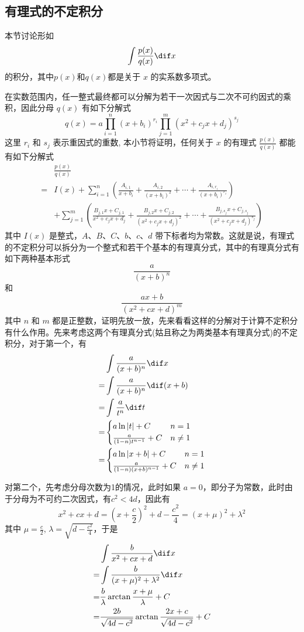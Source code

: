 \subsection{有理式的不定积分}
\label{sec:indefinite-integration-of-rational-function}

本节讨论形如
\[ \int \frac{p(x)}{q(x)} \dif x \]
的积分，其中$p(x)$和$q(x)$都是关于 $x$ 的实系数多项式。

在实数范围内，任一整式最终都可以分解为若干一次因式与二次不可约因式的乘积，因此分母 $q(x)$ 有如下分解式
\[ q(x) = a \prod_{i=1}^n(x+b_i)^{r_i} \prod_{j=1}^m(x^2+c_j x + d_j)^{s_j} \]
这里 $r_i$ 和 $s_j$ 表示重因式的重数, 本小节将证明，任何关于 $x$ 的有理式 $ \frac{p(x)}{q(x)} $ 都能有如下分解式
\begin{align*}
 & \frac{p(x)}{q(x)} \\
 = & I(x) + \sum_{i=1}^{n} \left( \frac{A_{i,1}}{x+b_i} + \frac{A_{i,2}}{(x+b_i)^2} + \cdots + \frac{A_{i,r_i}}{(x+b_i)^{r_i}}  \right) \\
 & + \sum_{j=1}^m \left( \frac{B_{j,1}x+C_{j,1}}{x^2+c_j x + d_j} + \frac{B_{j,2}x+C_{j,2}}{(x^2+c_j x + d_j)^2} + \cdots + \frac{B_{j,s_j}x+C_{j,s_j}}{(x^2+c_j x + d_j)^{s_j}} \right)
\end{align*}
其中 $I(x)$ 是整式，$A$、$B$、$C$、$b$、$c$、$d$ 带下标者均为常数。这就是说，有理式的不定积分可以拆分为一个整式和若干个基本的有理真分式，其中的有理真分式有如下两种基本形式
\[ \frac{a}{(x+b)^n} \]
和
\[ \frac{ax+b}{(x^2+cx+d)^m}  \]
其中 $n$ 和 $m$ 都是正整数，证明先放一放，先来看看这样的分解对于计算不定积分有什么作用。先来考虑这两个有理真分式(姑且称之为两类基本有理真分式)的不定积分，对于第一个，有
\begin{align*}
 & \int \frac{a}{(x+b)^n} \dif x \\
 = & \int \frac{a}{(x+b)^n}  \dif (x+b) \\
 = &\int \frac{a}{t^n} \dif t \\
 = & 
 \begin{cases}
    a\ln|t| + C & n=1 \\
    \frac{a}{(1-n)t^{n-1}} + C & n \neq 1
 \end{cases} \\
 = &
  \begin{cases}
    a\ln{|x+b|} + C & n=1 \\
    \frac{a}{(1-n)(x+b)^{n-1}} + C & n \neq 1
 \end{cases} \\
\end{align*}

对第二个，先考虑分母次数为1的情况，此时如果 $a=0$，即分子为常数，此时由于分母为不可约二次因式，有$c^2<4d$，因此有
\[ x^2+cx+d=\left(x+\frac{c}{2}\right)^2+d-\frac{c^2}{4} = (x+\mu)^2+\lambda^2 \]
其中 $\mu = \frac{c}{2}$, $\lambda = \sqrt{d-\frac{c^2}{4}}$，于是
\begin{align*}
 &  \int \frac{b}{x^2+cx+d} \dif x \\
  = & \int \frac{b}{(x+\mu)^2+\lambda^2} \dif x \\
  = & \frac{b}{\lambda} \arctan{\frac{x+\mu}{\lambda}} + C \\
  = & \frac{2b}{\sqrt{4d-c^{2}}} \arctan{\frac{2x+c}{\sqrt{4d-c^2}}} + C
\end{align*}

